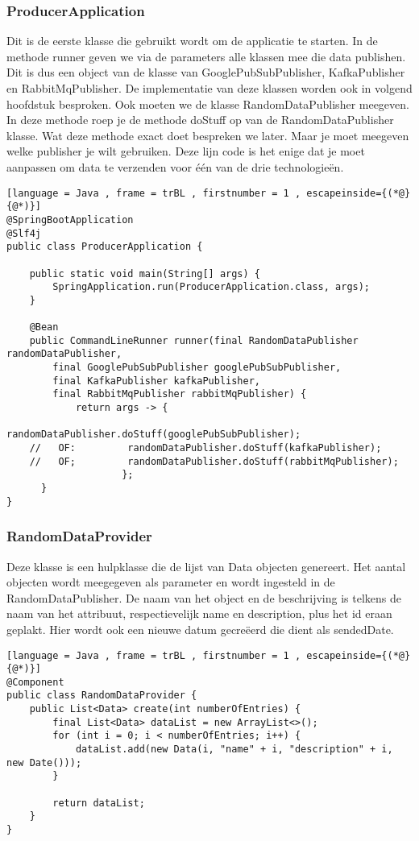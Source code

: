 \subsubsection{ProducerApplication}
Dit is de eerste klasse die gebruikt wordt om de applicatie te starten. In de methode runner geven we via de parameters alle klassen mee die data publishen. Dit is dus een object van de klasse van GooglePubSubPublisher, KafkaPublisher en RabbitMqPublisher. De implementatie van deze klassen worden ook in volgend hoofdstuk besproken. Ook moeten we de klasse RandomDataPublisher meegeven. In deze methode roep je de methode doStuff op van de RandomDataPublisher klasse. Wat deze methode exact doet bespreken we later. Maar je moet meegeven welke publisher je wilt gebruiken. Deze lijn code is het enige dat je moet aanpassen om data te verzenden voor één van de drie technologieën.

\begin{lstlisting}[language = Java , frame = trBL , firstnumber = 1 , escapeinside={(*@}{@*)}]
@SpringBootApplication
@Slf4j
public class ProducerApplication {

    public static void main(String[] args) {
        SpringApplication.run(ProducerApplication.class, args);
    }

    @Bean
    public CommandLineRunner runner(final RandomDataPublisher randomDataPublisher,
        final GooglePubSubPublisher googlePubSubPublisher,
        final KafkaPublisher kafkaPublisher,
        final RabbitMqPublisher rabbitMqPublisher) {
            return args -> {
                       randomDataPublisher.doStuff(googlePubSubPublisher);
    //   OF:         randomDataPublisher.doStuff(kafkaPublisher);
    //   OF;         randomDataPublisher.doStuff(rabbitMqPublisher);
                    };
      }
}
\end{lstlisting}
\subsubsection{RandomDataProvider}
Deze klasse is een hulpklasse die de lijst van Data objecten genereert. Het aantal objecten wordt meegegeven als parameter en wordt ingesteld in de RandomDataPublisher. De naam van het object en de beschrijving is telkens de naam van het attribuut, respectievelijk name en description, plus het id eraan geplakt. Hier wordt ook een nieuwe datum gecreëerd die dient als sendedDate.
\begin{lstlisting}[language = Java , frame = trBL , firstnumber = 1 , escapeinside={(*@}{@*)}]
@Component
public class RandomDataProvider {
    public List<Data> create(int numberOfEntries) {
        final List<Data> dataList = new ArrayList<>();
        for (int i = 0; i < numberOfEntries; i++) {
            dataList.add(new Data(i, "name" + i, "description" + i, new Date()));
        }

        return dataList;
    }
}
\end{lstlisting}

